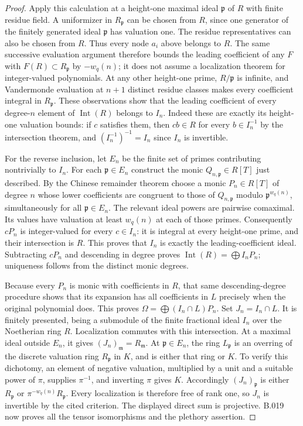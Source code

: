\begin{proof}
Apply this calculation at a height-one maximal ideal
$\mathfrak p$ of $R$ with finite residue field. A uniformizer in
$R_{\mathfrak p}$ can be chosen from $R$, since one generator of
the finitely generated ideal $\mathfrak p$ has valuation one.
The residue representatives can also be chosen from $R$.
Thus every node $a_i$ above belongs to $R$. The same successive
evaluation argument therefore bounds the leading coefficient of
any $F$ with $F(R)\subset R_{\mathfrak p}$ by
$-w_q(n)$; it does not assume a localization theorem for
integer-valued polynomials. At any other height-one prime,
$R/\mathfrak p$ is infinite, and Vandermonde evaluation at $n+1$
distinct residue classes makes every coefficient integral in
$R_{\mathfrak p}$. These observations show that the leading
coefficient of every degree-$n$ element of $\operatorname{Int}(R)$
belongs to $I_n$. Indeed these are exactly its height-one valuation
bounds: if $c$ satisfies them, then $cb\in R$ for every
$b\in I_n^{-1}$ by the intersection theorem, and
$(I_n^{-1})^{-1}=I_n$ since $I_n$ is invertible.

For the reverse inclusion, let $E_n$ be the finite set of primes
contributing nontrivially to $I_n$. For each $\mathfrak p\in E_n$
construct the monic $Q_{n,\mathfrak p}\in R[T]$ just described.
By the Chinese remainder theorem choose a monic $P_n\in R[T]$
of degree $n$ whose lower coefficients are congruent to those of
$Q_{n,\mathfrak p}$ modulo $\mathfrak p^{w_q(n)}$, simultaneously
for all $\mathfrak p\in E_n$. The relevant ideal powers are
pairwise comaximal. Its values have valuation at least $w_q(n)$
at each of those primes. Consequently $cP_n$ is integer-valued
for every $c\in I_n$: it is integral at every height-one prime,
and their intersection is $R$. This proves that $I_n$ is exactly
the leading-coefficient ideal. Subtracting $cP_n$ and descending
in degree proves
$\operatorname{Int}(R)=\bigoplus I_nP_n$; uniqueness follows from
the distinct monic degrees.

Because every $P_n$ is monic with coefficients in $R$, that same
descending-degree procedure shows that its expansion has all
coefficients in $L$ precisely when the original polynomial does.
This proves $\Omega=\bigoplus (I_n\cap L)P_n$.
Set $J_n=I_n\cap L$. It is finitely presented, being a submodule of
the finite fractional ideal $I_n$ over the Noetherian ring $R$.
Localization commutes with this intersection. At a maximal ideal
outside $E_n$, it gives $(J_n)_{\mathfrak m}=R_{\mathfrak m}$.
At $\mathfrak p\in E_n$, the ring $L_{\mathfrak p}$ is an overring
of the discrete valuation ring $R_{\mathfrak p}$ in $K$, and is
either that ring or $K$. To verify this dichotomy, an element of
negative valuation, multiplied by a unit and a suitable power of
$\pi$, supplies $\pi^{-1}$, and inverting $\pi$ gives $K$.
Accordingly $(J_n)_{\mathfrak p}$ is either $R_{\mathfrak p}$ or
$\pi^{-w_q(n)}R_{\mathfrak p}$. Every localization is therefore
free of rank one, so $J_n$ is invertible by the cited criterion.
The displayed direct sum is projective. B.019 now proves all the
tensor isomorphisms and the plethory assertion.
\end{proof}

